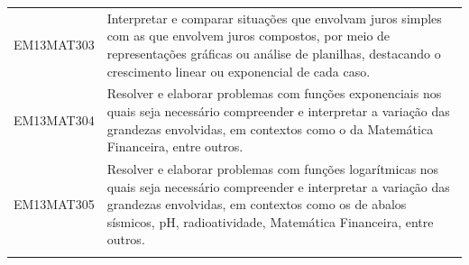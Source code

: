 \documentclass[12pt]{extarticle}
\begin{document}
\begin{longtable}{ll}
EM13MAT303 & Interpretar e comparar situações que envolvam juros simples com as que envolvem juros compostos, por meio de representações gráficas ou análise de planilhas, destacando o crescimento linear ou exponencial de cada caso.                                                                                                                                                                                                                                                                                                                                                                                                                                                                                                                                                                                            \\
\rowcolor[HTML]{FFF} 
EM13MAT304 & Resolver e elaborar problemas com funções exponenciais nos quais seja necessário compreender e interpretar a variação das grandezas envolvidas, em contextos como o da Matemática Financeira, entre outros.                                                                                                                                                                                                                                                                                                                                                                                                                                                                                                                                                                                                           \\
\rowcolor[HTML]{E0F7FA} 
EM13MAT305 & Resolver e elaborar problemas com funções logarítmicas nos quais seja necessário compreender e interpretar a variação das grandezas envolvidas, em contextos como os de abalos sísmicos, pH, radioatividade, Matemática Financeira, entre outros.                                                                                                                                                                                                                                                                                                                                                                                                                                                                                                                                                                     \\
\rowcolor[HTML]{FFF} 

\end{longtable}
\end{document}
